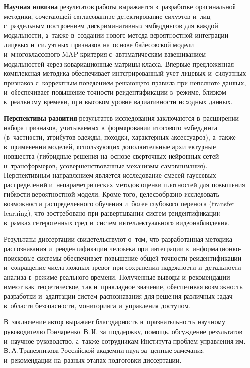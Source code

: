 \textbf{Научная новизна} результатов работы выражается в~разработке
оригинальной методики, сочетающей согласованное детектирование
силуэтов и~лиц с~раздельным построением дискриминативных эмбеддингов
для каждой модальности, а~также в~создании нового метода вероятностной
интеграции лицевых и~силуэтных признаков на~основе байесовской модели
и~многоклассового MAP-критерия с~автоматическим взвешиванием
модальностей через ковариационные матрицы класса. Впервые предложенная
комплексная методика обеспечивает интегрированный учет лицевых
и~силуэтных признаков с~корректным поведением решающего правила при
неполноте данных, и~обеспечивает повышение точности реидентификации
в~режиме, близком к~реальному времени, при высоком уровне
вариативности исходных данных.

\textbf{Перспективы развития} результатов исследования заключаются
в~расширении набора признаков, учитываемых в~формировании итогового
эмбеддинга (в~частности, атрибутов одежды, походки, характерных
аксессуаров), а~также в~применении моделей, использующих
дополнительные архитектурные новшества (гибридные решения на~основе
сверточных нейронных сетей и~трансформеров, усовершенствованные
механизмы самовнимания). Перспективным направлением является
исследование смесей гауссовых распределений и~непараметрических
методов оценки плотностей для повышения гибкости вероятностной модели.
Кроме того, целесообразно исследовать возможности распределенного
обучения и~более глубокого переноса (transfer learning), что
востребовано при развертывании систем реидентификации в~рамках
гетерогенных сред и~систем интеллектуального видеонаблюдения.

Результаты диссертации свидетельствуют о~том, что
разработанная методика распознавания и~реидентификации человека при
интеграции в~информационно-поисковые системы обеспечивает повышение
общей точности реидентификации и~сокращение числа ложных тревог при
сохранении надежности и~детальности анализа в~режиме реального
времени. Полученные выводы и~рекомендации имеют как теоретическое,
так и~прикладное значение, обеспечивая возможность
разработки и~адаптации систем распознавания для решения различных
задач в~области безопасности, мониторинга и~управления доступом.

В~заключение автор выражает благодарность и~признательность научному
руководителю Гончаренко~В.\,И. за~поддержку, помощь, обсуждение
результатов и~научное руководство, а~также сотрудникам Института
проблем управления им.\,В.\,А.\,Трапезникова Российской академии наук
за~ценные замечания и~рекомендации на~разных этапах подготовки
диссертации.

